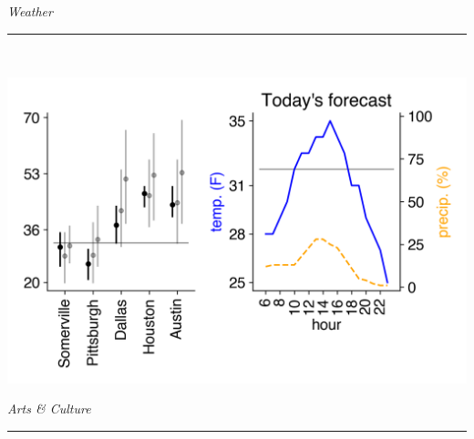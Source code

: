 \documentclass[landscape]{article}
\date{\today}
\renewcommand\headline[1]{\begin{center} {\huge \textsl{ #1}}\\ %
			\rule[5pt]{0.8\hsize}{0.5pt}\\ \end{center}}
\begin{document}
\maketitle

\begin{multicols}{3}

\headline{Weather}
\vspace{-0.5cm}\includegraphics[width=\linewidth]{images/weather.png}

\headline{Arts \& Culture}
\vspace{-0.3cm}


\noindent


\end{multicols}
\end{document}
